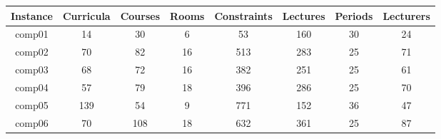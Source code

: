 \begin{table}[h!]
\footnotesize
\begin{center}
\begin{tabular}{ |c|c|c|c|c|c|c|c| }
\hline
\textbf{Instance} & \textbf{Curricula} & \textbf{Courses} & \textbf{Rooms} & \textbf{Constraints} & \textbf{Lectures} & \textbf{Periods} & \textbf{Lecturers} \\
\hline
comp01                                    & 14                                         & 30                                       & 6                                      & 53                                           & 160                                       & 30                                       & 24                                        \\
comp02                                    & 70                                         & 82                                       & 16                                     & 513                                          & 283                                       & 25                                       & 71                                     \\
comp03                                    & 68                                         & 72                                       & 16                                     & 382                                          & 251                                       & 25                                       & 61                                        \\
comp04                                    & 57                                         & 79                                       & 18                                     & 396                                          & 286                                       & 25                                       & 70                                        \\
comp05                                    & 139                                        & 54                                       & 9                                      & 771                                          & 152                                       & 36                                       & 47                                        \\
comp06                                    & 70                                         & 108                                      & 18                                     & 632                                          & 361                                       & 25                                       & 87                                        \\

\end{tabular}
\end{center}
\end{table}
